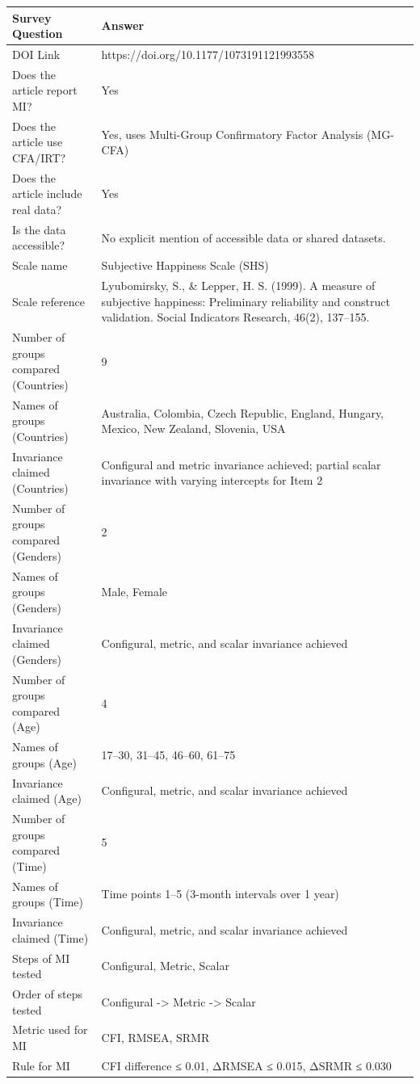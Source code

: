 \documentclass[
  english,
  man]{apa7}
\begin{document}
\begin{tabular}{l|l}
\hline
Survey Question & Answer\\
\hline
DOI Link & https://doi.org/10.1177/1073191121993558\\
\hline
Does the article report MI? & Yes\\
\hline
Does the article use CFA/IRT? & Yes, uses Multi-Group Confirmatory Factor Analysis (MG-CFA)\\
\hline
Does the article include real data? & Yes\\
\hline
Is the data accessible? & No explicit mention of accessible data or shared datasets.\\
\hline
Scale name & Subjective Happiness Scale (SHS)\\
\hline
Scale reference & Lyubomirsky, S., \& Lepper, H. S. (1999). A measure of subjective happiness: Preliminary reliability and construct validation. Social Indicators Research, 46(2), 137–155.\\
\hline
Number of groups compared (Countries) & 9\\
\hline
Names of groups (Countries) & Australia, Colombia, Czech Republic, England, Hungary, Mexico, New Zealand, Slovenia, USA\\
\hline
Invariance claimed (Countries) & Configural and metric invariance achieved; partial scalar invariance with varying intercepts for Item 2\\
\hline
Number of groups compared (Genders) & 2\\
\hline
Names of groups (Genders) & Male, Female\\
\hline
Invariance claimed (Genders) & Configural, metric, and scalar invariance achieved\\
\hline
Number of groups compared (Age) & 4\\
\hline
Names of groups (Age) & 17–30, 31–45, 46–60, 61–75\\
\hline
Invariance claimed (Age) & Configural, metric, and scalar invariance achieved\\
\hline
Number of groups compared (Time) & 5\\
\hline
Names of groups (Time) & Time points 1–5 (3-month intervals over 1 year)\\
\hline
Invariance claimed (Time) & Configural, metric, and scalar invariance achieved\\
\hline
Steps of MI tested & Configural, Metric, Scalar\\
\hline
Order of steps tested & Configural -> Metric -> Scalar\\
\hline
Metric used for MI & CFI, RMSEA, SRMR\\
\hline
Rule for MI & CFI difference ≤ 0.01, ΔRMSEA ≤ 0.015, ΔSRMR ≤ 0.030\\
\hline
\end{tabular}
\end{document}
